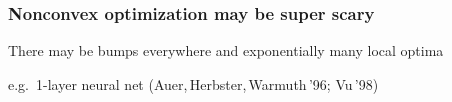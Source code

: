 \documentclass[compress,
mathserif,wide,%
]{beamer}
\newcommand{\yuxinRegFigs}{figure}
\begin{document}
\begin{frame}
\frametitle{Nonconvex optimization may be super scary }

\vspace{-4em}




{

\begin{varblock}[\textwidth]{}
\begin{center}
  	There may be bumps everywhere and  exponentially many local optima
\end{center}
\end{varblock}
}


\smallskip
\hfill e.g.~1-layer neural net (Auer,\,Herbster,\,Warmuth\,'96; Vu\,'98)



\end{frame}



\begin{comment}
\begin{frame}
	\frametitle{Nonconvex optimization in statistics}
	\begin{itemize}
		\item MLE of mixture models 
		\item Rank or sparsity constrained estimation
		\item Deep learning 
	\end{itemize}
\begin{figure}
	\centering
	\texttt{[image: \\yuxinRegFigs/convex\_vs\_nonconvex.jpg]}
\end{figure}
\hfill {\footnotesize figure credit: Reza Zadeh}
\end{frame}
\end{comment}
\end{document}
